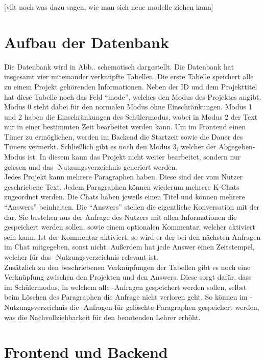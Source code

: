 \documentclass[../main.tex]{subfiles}
\begin{document}
[vllt noch was dazu sagen, wie man sich neue modelle ziehen kann]

\section{Aufbau der Datenbank}
Die Datenbank wird in Abb.. schematisch dargestellt. Die Datenbank hat insgesamt vier miteinander verknüpfte Tabellen. Die erste Tabelle speichert alle zu einem Projekt gehörenden 
Informationen. Neben der ID und dem Projekttitel hat diese Tabelle noch das Feld "`mode"', welches den Modus des Projektes angibt. Modus 0 steht dabei für den normalen Modus ohne 
Einschränkungen. Modus 1 und 2 haben die Einschränkungen des Schülermodus, wobei in Modus 2 der Text nur in einer bestimmten Zeit bearbeitet werden kann. Um im Frontend einen Timer 
zu ermöglichen, werden im Backend die Startzeit sowie die Dauer des Timers vermerkt. Schließlich gibt es noch den Modus 3, welcher der Abgegeben-Modus ist. In diesem kann das Projekt 
nicht weiter bearbeitet, sondern nur gelesen und das -Nutzungsverzeichnis generiert werden.\\
Jedes Projekt kann mehrere Paragraphen haben. Diese sind der vom Nutzer geschriebene Text. Jedem Paragraphen können wiederum mehrere K-Chats zugeordnet werden. Die Chats haben 
jeweils einen Titel und können mehrere "`Answers"' beinhalten. Die "`Answers"' stellen die eigentliche Konversation mit der  dar. Sie bestehen aus der Anfrage des Nutzers mit allen 
Informationen die gespeichert werden sollen, sowie einem optionalen Kommentar, welcher aktiviert sein kann. Ist der Kommentar aktiviert, so wird er der  bei den nächsten Anfragen 
im Chat mitgegeben, sonst nicht. Außerdem hat jede Answer einen Zeitstempel, welcher für das -Nutzungsverzeichnis relevant ist.\\
Zusätzlich zu den beschriebenen Verknüpfungen der Tabellen gibt es noch eine Verknüpfung zwischen den Projekten und den Answers. Diese sorgt dafür, dass im Schülermodus, in welchem 
alle -Anfragen gespeichert werden sollen, selbst beim Löschen des Paragraphen die Anfrage nicht verloren geht. So können im -Nutzungsverzeichnis die -Anfragen für gelöschte 
Paragraphen gespeichert werden, was die Nachvollziehbarkeit für den benotenden Lehrer erhöht.

\section{Frontend und Backend}
\end{document}
